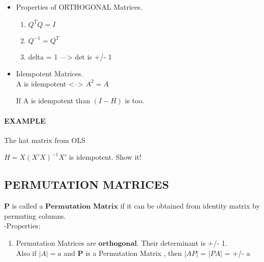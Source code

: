 \documentclass[]{article}
\providecommand{\tightlist}{%
  \setlength{\itemsep}{0pt}\setlength{\parskip}{0pt}}
\let\oldparagraph\paragraph
\renewcommand{\paragraph}[1]{\oldparagraph{#1}\mbox{}}
\begin{document}
\begin{itemize}
\item
  Properties of ORTHOGONAL Matrices.\\

  \begin{enumerate}
  \def\labelenumi{\roman{enumi})}
  \tightlist
  \item
    \(Q^{T}Q=I\)\\
  \item
    \(Q^{-1}=Q^{T}\)\\
  \item
    \textbar{}delta\textbar{} = 1 ---\textgreater{} det is +/- 1\\
  \end{enumerate}
\item
  Idempotent Matrices.\\

  A is idempotent \textless{}--\textgreater{} \(A^{2}=A\)

  If A is idempotent than \((I - H)\) is too.
\end{itemize}

\paragraph{\texorpdfstring{EXAMPLE\\
}{EXAMPLE }}\label{example-7}

The hat matrix from OLS

\(H=X(X'X)^{-1}X'\) is idempotent. Show it!

\subsection{\texorpdfstring{PERMUTATION MATRICES\\
}{PERMUTATION MATRICES }}\label{permutation-matrices}

\(\textbf{P}\) is called a \(\textbf{Permutation Matrix}\) if it can be
obtained from identity matrix by permuting columns.\\

-Properties:

\begin{enumerate}
\def\labelenumi{\alph{enumi})}
\tightlist
\item
  Permutation Matrices are \(\textbf{orthogonal}\). Their determinant is
  +/- 1.\\
   Also if \(|A| = a\) and \(\textbf{P}\) is a Permutation Matrix , then
  \(|AP|\) = \(|PA|\) = +/- a\\
\end{enumerate}
\end{document}
